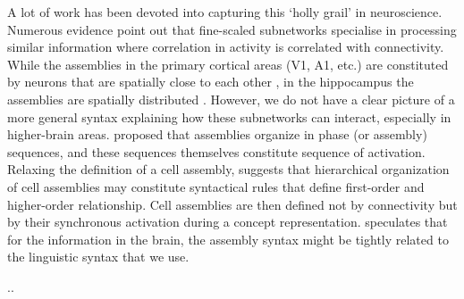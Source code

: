 
    A lot of work has been devoted into capturing this `holly grail' in
    neuroscience. Numerous evidence point out that fine-scaled subnetworks
    specialise in processing similar information where correlation in activity
    is correlated with connectivity. While the assemblies in the primary
    cortical areas (V1, A1, etc.) are constituted by neurons that are spatially
    close to each other \cite[e.g.,][]{Bathellier2012, Cossell2015}, in the
    hippocampus the assemblies are spatially distributed \citep{Guzman2016}.
    However, we do not have a clear
    picture of a more general syntax explaining how these subnetworks can
    interact, especially in higher-brain areas. \cite{Hebb49} proposed that
    assemblies organize in phase (or assembly) sequences, and these sequences
    themselves constitute sequence of activation. Relaxing the definition of a
    cell assembly, \cite{Buzsaki2010} suggests that hierarchical organization
    of cell assemblies may constitute syntactical rules that define first-order
    and higher-order relationship. Cell assemblies are then defined not by
    connectivity but by their synchronous activation during a concept
    representation. \cite{Pulvermuller2010} speculates that for the information
    in the brain, the assembly syntax might be tightly related to the
    linguistic syntax that we use. 



 

..
  


